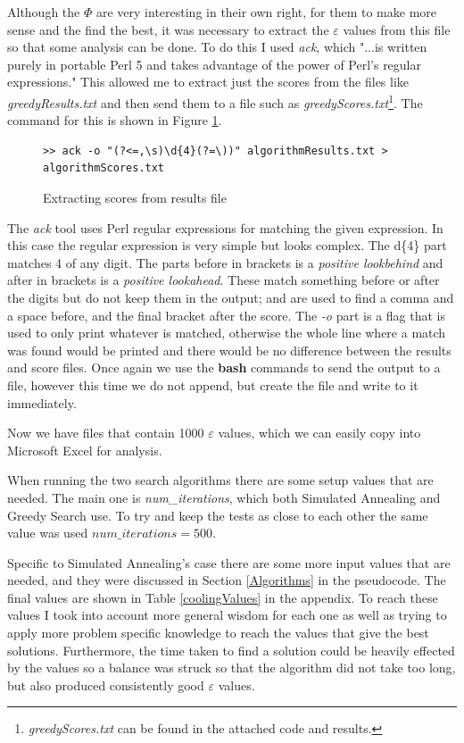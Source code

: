 \documentclass[12pt]{report}
\begin{document}
Although the $\Phi$ are very interesting in their own right, for them to make more sense and the find the best, it was necessary to extract the $\varepsilon$ values from this file so that some analysis can be done. To do this I used \textit{ack}\cite{ack}, which "...is written purely in portable Perl 5 and takes advantage of the power of Perl's regular expressions." This allowed me to extract just the scores from the files like \textit{greedyResults.txt} and then send them to a file such as \textit{greedyScores.txt}\footnote{\textit{greedyScores.txt} can be found in the attached code and results.}. The command for this is shown in Figure \ref{ackCommand}.

\begin{figure}[H]
\caption{Extracting scores from results file}
\label{ackCommand}
\begin{verbatim}
>> ack -o "(?<=,\s)\d{4}(?=\))" algorithmResults.txt > algorithmScores.txt
\end{verbatim}
\end{figure}

The \textit{ack} tool uses Perl regular expressions for matching the given expression. In this case the regular expression is very simple but looks complex. The d\{4\} part matches 4 of any digit. The parts before in brackets is a \textit{positive lookbehind} and after in brackets is a \textit{positive lookahead}. These match something before or after the digits but do not keep them in the output; and are used to find a comma and a space before, and the final bracket after the score. The \textit{-o} part is a flag that is used to only print whatever is matched, otherwise the whole line where a match was found would be printed and there would be no difference between the results and score files. Once again we use the \textbf{bash} commands to send the output to a file, however this time we do not append, but create the file and write to it immediately.

Now we have files that contain 1000 $\varepsilon$ values, which we can easily copy into Microsoft Excel for analysis.

When running the two search algorithms there are some setup values that are needed. The main one is \textit{num\_iterations}, which both Simulated Annealing and Greedy Search use. To try and keep the tests as close to each other the same value was used $num\_iterations = 500$.

Specific to Simulated Annealing's case there are some more input values that are needed, and they were discussed in Section \ref{Algorithms} in the pseudocode. The final values are shown in Table \ref{coolingValues} in the appendix. To reach these values I took into account more general wisdom for each one as well as trying to apply more problem specific knowledge to reach the values that give the best solutions. Furthermore, the time taken to find a solution could be heavily effected by the values so a balance was struck so that the algorithm did not take too long, but also produced consistently good $\varepsilon$ values.
\end{document}
